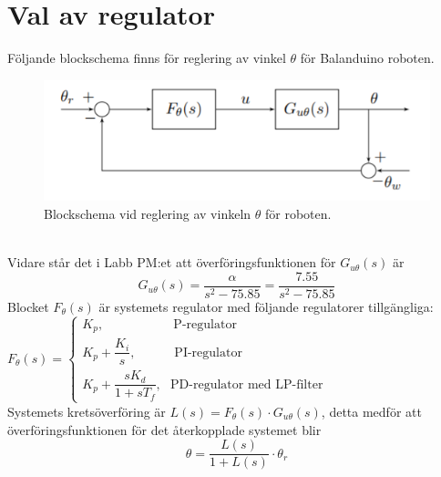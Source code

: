 \documentclass[11pt]{article}
\begin{document}


\newpage
\renewcommand{\contentsname}{Innehållsförteckning}
\tableofcontents
\pagestyle{empty}
\newpage
\setcounter{page}{1}
\pagestyle{fancy}
\section{Val av regulator}
Följande blockschema finns för reglering av vinkel $\theta$ för Balanduino roboten.
\begin{figure}[h!]
\centering
\includegraphics[scale=1]{Figures/blockschema.png}
\caption{ Blockschema vid reglering av vinkeln $\theta$ för roboten.}
\end{figure}\\
Vidare står det i Labb PM:et att överföringsfunktionen för $G_{u \theta}(s)$ är
$$G_{u\theta}(s)=\dfrac{\alpha}{s^2-75.85}=\dfrac{7.55}{s^2-75.85}$$
Blocket $F_\theta(s)$ är systemets regulator med följande regulatorer tillgängliga:\\[0.5em]

$
F_\theta(s)=
\begin{cases}
K_p, \quad \quad \quad \quad \quad \ \ \text{P-regulator}\\[0.5em]
K_p+\dfrac{K_i}{s}, \quad \quad \quad \text{PI-regulator}\\[0.5em]
K_p+\dfrac{sK_d}{1+sT_f},  \ \ \ \text{PD-regulator med LP-filter}
\end{cases}
$ \\[1em]
Systemets kretsöverföring är $L(s)=F_\theta(s)\cdot G_{u \theta}(s)$, detta medför att överföringsfunktionen för det återkopplade systemet blir\\[0.5em]
\begin{equation}
\theta = \dfrac{L(s)}{1+L(s)}\cdot \theta_r
\end{equation}
\end{document}
